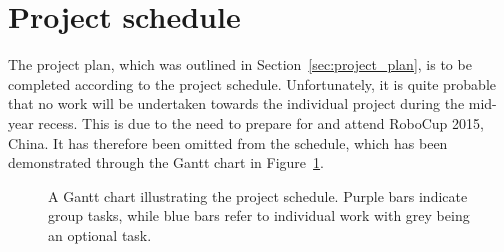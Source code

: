 \documentclass[
	fontsize=11pt
	headlines=2,
	footlines=2,
	parskip=half
]{scrartcl}
\begin{document}
	\section{Project schedule} {
	\label{sec:project_schedule}
	
		The project plan, which was outlined in Section~\ref{sec:project_plan}, is to be completed according to the project schedule. Unfortunately, it is quite probable that no work will be undertaken towards the individual project during the mid-year recess. This is due to the need to prepare for and attend RoboCup 2015, China. It has therefore been omitted from the schedule, which has been demonstrated through the Gantt chart in Figure~\ref{fig:schedule}.

		\begin{figure}[H]
	        \makebox[\textwidth][c]{\resizebox{0.95\paperwidth}{!}{}}
			\caption[Project schedule] {A Gantt chart illustrating the project schedule. Purple bars indicate group tasks, while blue bars refer to individual work with grey being an optional task.}
			\label{fig:schedule}
		\end{figure}
		
	}
	
\end{document}
